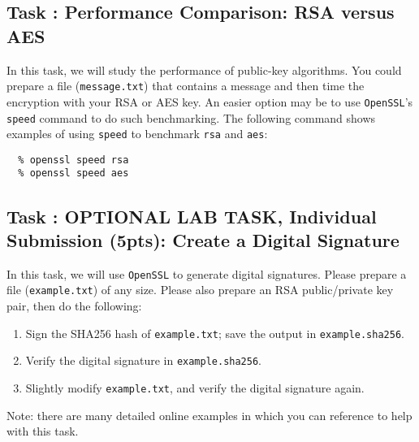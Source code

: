 \documentclass{article}
\begin{document}
\subsection{Task \mytask: Performance Comparison: RSA versus AES}

In this task, we will study the performance of public-key algorithms. You could prepare a file ({\tt message.txt}) that contains a  
message and then time the encryption with your RSA or AES key. An easier option may be to use {\tt OpenSSL}'s {\tt speed} command to do such benchmarking. The following command shows examples of using 
{\tt speed} to benchmark {\tt rsa} and {\tt aes}:
\begin{verbatim} 
  % openssl speed rsa
  % openssl speed aes
\end{verbatim} 




\subsection{Task \mytask: OPTIONAL LAB TASK, Individual Submission (5pts): Create a Digital Signature}

In this task, we will use {\tt OpenSSL} to generate digital signatures. 
Please prepare a file ({\tt example.txt}) of any size. Please also
prepare an RSA public/private key pair, then do the following:

\begin{enumerate}
\item Sign the SHA256 hash of {\tt example.txt}; save the output in
      {\tt example.sha256}. 
\item Verify the digital signature in {\tt example.sha256}.
\item Slightly modify {\tt example.txt}, and verify the digital
      signature again.
\end{enumerate}


Note: there are many detailed online examples in which you can reference to help with this task.
\end{document}
